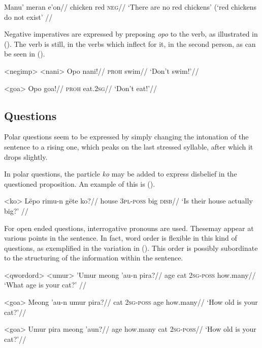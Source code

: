 \documentclass[12pt]{article}
\begin{document}
\begingl %
\gla Manu' meran e'on//
\glb chicken red \textsc{neg}//
\glft `There are no red chickens' (`red chickens do not exist' // 
\endgl
\xe

Negative imperatives are expressed by preposing \textit{opo} to the verb, as illustrated in (). The verb is still, in the verbs which inflect for it, in the second person, as can be seen in ().

\pex<negimp> %
\a<nani> %
\begingl %
\gla Opo nani!//
\glb \textsc{proh} swim//
\glft `Don't swim!'//
\endgl

\a<goa> %
\begingl %
\gla Opo goa!//
\glb \textsc{proh} eat.\textsc{2sg}//
\glft `Don't eat!'// 
\endgl
\xe

\subsection{Questions}

Polar questions seem to be expressed by simply changing the intonation of the sentence to a rising one, which peaks on the last stressed syllable, after which it drops slightly.

In polar questions, the particle \textit{ko} may be added to express disbelief in the questioned proposition. An example of this is ().

\ex<ko>
\begingl %
\gla Lëpo rimu-n gëte ko?//
\glb house 3\textsc{pl}-\textsc{poss} big \textsc{disb}//
\glft `Is their house actually big?' // 
\endgl 
\xe

For open ended questions, interrogative pronouns are used. Thesemay appear at various points in the sentence. In fact, word order is flexible in this kind of questions, as exemplified in the variation in (). This order is possibly subordinate to the structuring of the information within the sentence.

\pex<qwordord> %
\a<umur>
\begingl %
\gla 'Umur meong 'au-n pira?//
\glb age cat 2\textsc{sg}-\textsc{poss} how.many//
\glft `What age is your cat?' // 
\endgl 

\a<goa> %
\begingl %
\gla Meong 'au-n umur pira?//
\glb cat \textsc{2sg}-\textsc{poss} age how.many//
\glft `How old is your cat?'// 
\endgl

\a<goa> %
\begingl %
\gla Umur pira meong 'aun?//
\glb age how.many cat \textsc{2sg}-\textsc{poss}//
\glft `How old is your cat?'// 
\endgl
\xe
\end{document}
